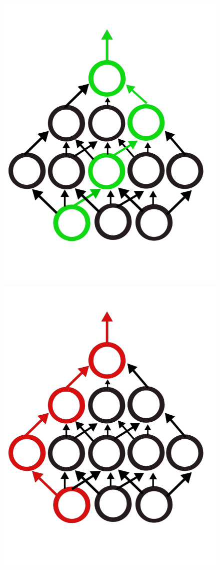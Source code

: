 \begin{figure}[!htb]
  \includegraphics[width=\linewidth]{./Images/Chapter05/mlp_ticket_3.pdf}
\endminipage\hfill
{}%
  \includegraphics[width=\linewidth]{./Images/Chapter05/random_ticket_1.pdf}

\end{figure}

